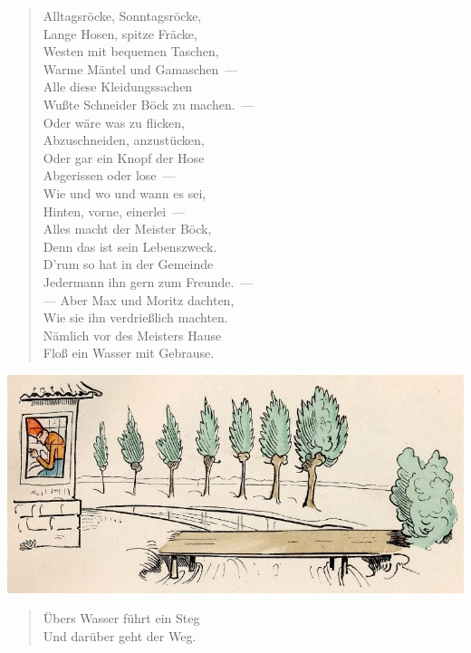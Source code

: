 \documentclass[a4paper,12pt]{article}
\begin{document}
\begin{verse}
Alltagsröcke, Sonntagsröcke,\\{}
Lange Hosen, spitze Fräcke,\\{}
Westen mit bequemen Taschen,\\{}
Warme Mäntel und Gamaschen~—\\{}
Alle diese Kleidungssachen\\{}
Wußte Schneider Böck zu machen.~—\\{}
Oder wäre was zu flicken,\\{}
Abzuschneiden, anzustücken,\\{}
Oder gar ein Knopf der Hose\\{}
Abgerissen oder lose~—\\{}
Wie und wo und wann es sei,\\{}
Hinten, vorne, einerlei~—\\{}
Alles macht der Meister Böck,\\{}
Denn das ist sein Lebenszweck.\\{}
D'rum so hat in der Gemeinde\\{}
Jedermann ihn gern zum Freunde.~—\\{}
— Aber Max und Moritz dachten,\\{}
Wie sie ihn verdrießlich machten.\\{}
Nämlich vor des Meisters Hause\\{}
Floß ein Wasser mit Gebrause.
\end{verse}



\begin{center}\includegraphics[scale=.7, alt={Die Brücke}]{images/3-02.jpg}\end{center}



\begin{verse}
Übers Wasser führt ein Steg\\{}
Und darüber geht der Weg.
\end{verse}
\end{document}
